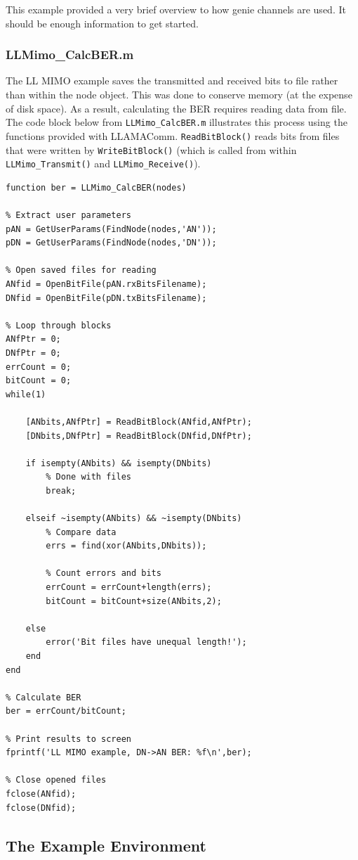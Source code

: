 This example provided a very brief overview to how genie channels
are used. It should be enough information to get started.

\subsubsection{LLMimo\_CalcBER.m}

The LL MIMO example saves the transmitted and received bits to file
rather than within the node object.  This was done to conserve
memory (at the expense of disk space).  As a result, calculating the
BER requires reading data from file.  The code block below from
\verb+LLMimo_CalcBER.m+ illustrates this process using the functions
provided with LLAMAComm.  \verb+ReadBitBlock()+ reads bits from
files that were written by \verb+WriteBitBlock()+ (which is called
from within \verb+LLMimo_Transmit()+ and \verb+LLMimo_Receive()+).

\begin{lstlisting}[name=llmimoCalcBER]
function ber = LLMimo_CalcBER(nodes)

% Extract user parameters
pAN = GetUserParams(FindNode(nodes,'AN'));
pDN = GetUserParams(FindNode(nodes,'DN'));

% Open saved files for reading
ANfid = OpenBitFile(pAN.rxBitsFilename);
DNfid = OpenBitFile(pDN.txBitsFilename);

% Loop through blocks
ANfPtr = 0;
DNfPtr = 0;
errCount = 0;
bitCount = 0;
while(1)

    [ANbits,ANfPtr] = ReadBitBlock(ANfid,ANfPtr);
    [DNbits,DNfPtr] = ReadBitBlock(DNfid,DNfPtr);

    if isempty(ANbits) && isempty(DNbits)
        % Done with files
        break;

    elseif ~isempty(ANbits) && ~isempty(DNbits)
        % Compare data
        errs = find(xor(ANbits,DNbits));

        % Count errors and bits
        errCount = errCount+length(errs);
        bitCount = bitCount+size(ANbits,2);

    else
        error('Bit files have unequal length!');
    end
end

% Calculate BER
ber = errCount/bitCount;

% Print results to screen
fprintf('LL MIMO example, DN->AN BER: %f\n',ber);

% Close opened files
fclose(ANfid);
fclose(DNfid);
\end{lstlisting}


\subsection{The Example Environment} \label{sec:exampleEnv}

